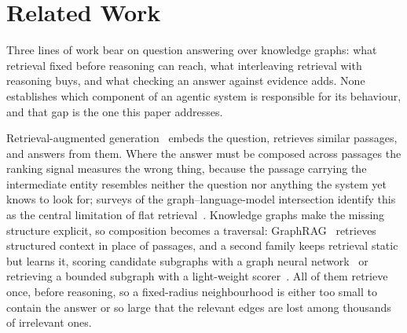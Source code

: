 %
%
%

\section{Related Work}\label{sec:related}

Three lines of work bear on question answering over knowledge graphs:
what retrieval fixed before reasoning can reach, what interleaving
retrieval with reasoning buys, and what checking an answer against
evidence adds. None establishes which component of an agentic system is
responsible for its behaviour, and that gap is the one this paper
addresses.

Retrieval-augmented generation~\cite{lewis2020retrieval} embeds the
question, retrieves similar passages, and answers from them. Where the
answer must be composed across passages the ranking signal measures the
wrong thing, because the passage carrying the intermediate entity
resembles neither the question nor anything the system yet knows to look
for; surveys of the graph--language-model intersection identify this as
the central limitation of flat retrieval~\cite{li2023survey}. Knowledge
graphs make the missing structure explicit, so composition becomes a
traversal: GraphRAG~\cite{edge2024local} retrieves structured context in
place of passages, and a second family keeps retrieval static but learns
it, scoring candidate subgraphs with a graph neural
network~\cite{mavromatis2024gnnrag} or retrieving a bounded subgraph
with a light-weight scorer~\cite{li2025subgraphrag}. All of them
retrieve once, before reasoning, so a fixed-radius neighbourhood is
either too small to contain the answer or so large that the relevant
edges are lost among thousands of irrelevant ones.

